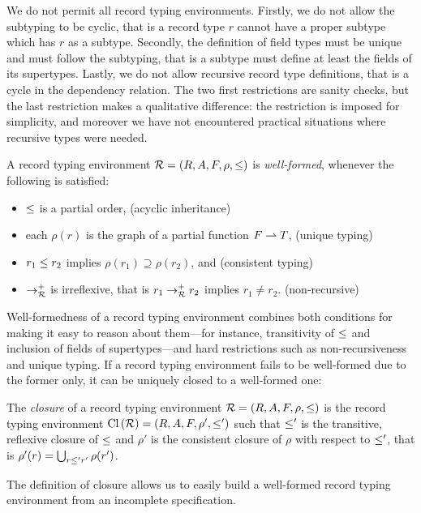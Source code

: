 We do not permit all record typing environments. Firstly, we do not
allow the subtyping to be cyclic, that is a record type $r$ cannot have
a proper subtype which has $r$ as a subtype. Secondly, the definition
of field types must be unique and must follow the subtyping, that is a
subtype must define at least the fields of its supertypes. Lastly, we
do not allow recursive record type definitions, that is a cycle in the
dependency relation. The two first restrictions are sanity checks, but
the last restriction makes a qualitative difference: the restriction
is imposed for simplicity, and moreover we have not encountered 
practical situations where recursive types were needed.
\begin{definition}
  \label{def:well-formed-recenv}
  A record typing environment ${\mathcal R}=(R,A,F,\rho,\le)$ is
  \emph{well-formed}, whenever the following is satisfied:
  \begin{itemize}
  \item $\le$ is a partial order, \hfill(acyclic inheritance)
  \item each $\rho(r)$ is the graph of a partial function $F \rightharpoonup
    T$, \hfill(unique typing)
  \item $r_1 \le r_2$ implies $\rho(r_1) \supseteq \rho(r_2)$, and
    \hfill(consistent typing)
  \item $\rightarrow^+_{\mathcal R}$ is irreflexive, that is $r_1
    \rightarrow^+_{\mathcal R} r_2$ implies $r_1 \neq
    r_2$. \hfill(non-recursive)
  \end{itemize}
\end{definition}

Well-formedness of a record typing environment combines both
conditions for making it easy to reason about them---for instance,
transitivity of $\le$ and inclusion of fields of supertypes---and
hard restrictions such as non-recursiveness and unique typing. If a
record typing environment fails to be well-formed due to the former
only, it can be uniquely closed to a well-formed one:
\begin{definition}%
  The \emph{closure} of a record typing environment ${\mathcal R} =
  (R,A,F,\rho,\le)$ is the record typing environment
  $\mathrm{Cl}\left({\mathcal R}\right) = (R,A,F,\rho',\le')$ such that $\le'$ is
  the transitive, reflexive closure of $\le$ and $\rho'$ is the
  consistent closure of $\rho$ with respect to $\le'$, that is $\rho'(r) =
  \bigcup_{r \le' r'}\rho(r')$.
\end{definition}
The definition of closure allows us to easily build a well-formed
record typing environment from an incomplete specification.

